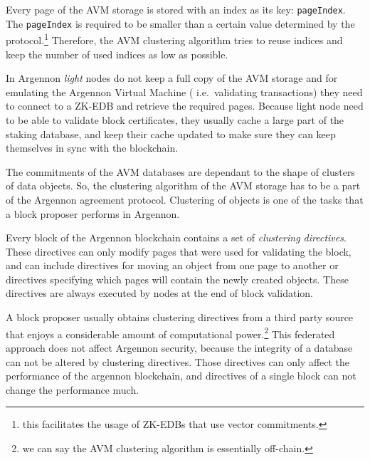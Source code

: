 Every page of the AVM storage is stored with an index as its key: \texttt{pageIndex}. The \texttt{pageIndex} is
required to be smaller than a certain value determined by the
protocol.\footnote{this facilitates the usage of ZK-EDBs that use vector commitments.}
Therefore, the AVM clustering algorithm tries to reuse indices and keep the number of used indices as low as
possible.

In Argennon \emph{light} nodes do not keep a full copy of the AVM storage and for emulating the Argennon Virtual Machine
( i.e.~validating transactions) they need to connect to a ZK-EDB and retrieve the required pages.
Because light node need to be able to validate block certificates, they usually cache a large part of the staking
database, and keep their cache updated to make sure they can keep themselves in sync with the blockchain.

The commitments of the AVM databases are dependant to the shape of clusters of data objects. So,
the clustering algorithm of the AVM storage has to be a part of the Argennon agreement protocol. Clustering of
objects is one of the tasks that a block proposer performs in Argennon.

Every block of the Argennon blockchain contains a set of \emph{clustering directives}. These directives
can only modify pages that were used for validating the block, and can
include directives for moving an object from one page to another or directives specifying which pages will contain
the newly created objects. These directives are always executed by nodes at the end of block validation.

A block proposer usually obtains clustering directives from a third party source that enjoys a considerable amount of
computational power.\footnote{we can say the AVM clustering algorithm is essentially off-chain.} This federated approach
does not affect Argennon security, because the integrity of a database can not be altered by clustering directives.
Those directives can only affect the performance of the argennon blockchain, and directives of a single block can
not change the performance much.
